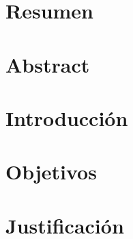 \documentclass[10pt, letterpaper]{report}
\newcommand{\defaultparformat}[1]{
	{\setlength{\parskip}{2ex}
    }
}
\begin{document}
	\chapter*{Resumen}
	\ifdefined\parpordefecto
		\defaultparformat{resumen}
	\else
		
	\fi
\fi

\ifdefined\CAPresumen
	\newpage
    \cleardoublepage{}
	\chapter*{Abstract}
	\ifdefined\parpordefecto
		\defaultparformat{abstract}
	\else
		
	\fi
\fi

\ifdefined\CAPintroduccion
	\newpage
	\setcounter{page}{1}
	\chapter{Introducción}
	\ifdefined\parpordefecto
		\defaultparformat{introduccion}
	\else
		
	\fi
\fi

\ifdefined\CAPobjetivos
	\newpage
	\chapter{Objetivos}
	\ifdefined\parpordefecto
		\defaultparformat{objetivos}
	\else
		
	\fi
\fi

\ifdefined\CAPjustificacion
	\newpage
    	\chapter{Justificación}
	\ifdefined\parpordefecto
		\defaultparformat{justificacion}
	\else
		
	\fi
\fi
\end{document}
